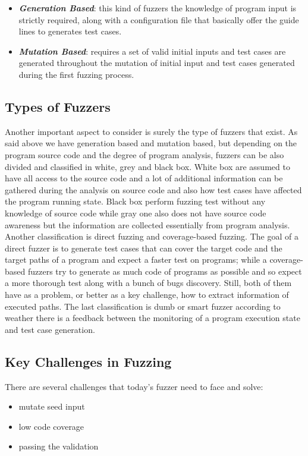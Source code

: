 \begin{itemize}
  \item \textbf{\textit{Generation Based}}: this kind of fuzzers the knowledge of program input is strictly required, along with a configuration file that basically offer the guide lines to generates test cases.
  \item \textbf{\textit{Mutation Based}}: requires a set of valid initial inputs and test cases are generated throughout the mutation of initial input and test cases generated during the first fuzzing process.
\end{itemize}

\subsection{Types of Fuzzers}
Another important aspect to consider is surely the type of fuzzers that exist. As said above we have generation based and mutation based, but depending on the program source code and the degree of program 
analysis, fuzzers can be also divided and classified in white, grey and black box.
White box are assumed to have all access to the source code and a lot of additional information can be gathered during the analysis on source code and also how test cases have affected the program running state. 
Black box perform fuzzing test without any knowledge of source code while gray one also does not have source code awareness but the information are collected essentially from program analysis.
Another classification is direct fuzzing and coverage-based fuzzing. The goal of a direct fuzzer is to generate test cases that can cover the target code and the target paths of a program and expect a faster test on programs; while a coverage-based fuzzers
try to generate as much code of programs as possible and so expect a more thorough test along with a bunch of bugs discovery. Still, both of them have as a problem, or better as a key challenge, how to extract information of executed paths.
The last classification is dumb or smart fuzzer according to weather there is a feedback between the monitoring of a program execution state and test case generation. 

\subsection{Key Challenges in Fuzzing}
There are several challenges that today's fuzzer need to face and solve:
\begin{itemize}
\item mutate seed input
\item low code coverage
\item passing the validation
\end{itemize}

